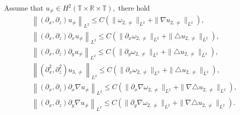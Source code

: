 \documentclass[10pt,a4paper]{amsart}
\begin{document}
	\begin{lemma}[]\label{lemma_u}
		Assume that $u_{\neq}\in H^{2}(\mathbb{T}\times\mathbb{R}\times\mathbb{T}),$  there hold
		\begin{equation}\label{eq:velocity embed}
			\begin{aligned}
				&\left\|(\partial_x,
				\partial_z)u_{\neq}\right\|_{L^2}\leq C(\|\omega_{2,\neq}\|_{L^2}
				+\|\nabla u_{2,\neq}\|_{L^2}),\\
				&\left\|(\partial_x,
				\partial_z)\partial_xu_{\neq}\right\|_{L^2}\leq C(\|\partial_x\omega_{2,\neq}\|_{L^2}
				+\|\triangle u_{2,\neq}\|_{L^2}),\\
				&\left\|(\partial_x,
				\partial_z)\partial_yu_{\neq}\right\|_{L^2}\leq C(\|\partial_y\omega_{2,\neq}\|_{L^2}
				+\|\triangle u_{2,\neq}\|_{L^2}),\\
				&\left\|(\partial_x^2,
				\partial_z^2)u_{3,\neq}\right\|_{L^2}
				\leq C(\|\partial_x\omega_{2,\neq}\|_{L^2}
				+\|\triangle u_{2,\neq}\|_{L^2}),\\
				&\left\|(\partial_x,
				\partial_z)\partial_x\nabla u_{\neq}\right\|_{L^2}\leq C(\|\partial_x\nabla\omega_{2,\neq}\|_{L^2}
				+\|\nabla\triangle u_{2,\neq}\|_{L^2}),\\
				&\left\|(\partial_x,
				\partial_z)\partial_y\nabla u_{\neq}\right\|_{L^2}\leq C(\|\partial_y\nabla\omega_{2,\neq}\|_{L^2}
				+\|\nabla\triangle u_{2,\neq}\|_{L^2}).\end{aligned}
		\end{equation}
	\end{lemma}
\end{document}
